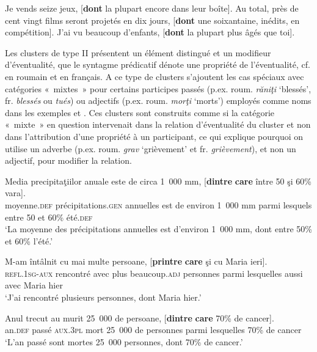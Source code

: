 \ea \label{ch3:ex32}
\ea
Je vends seize jeux, [\textbf{dont} la plupart encore dans leur boîte]. \label{ch3:ex32a}
\ex 
Au total, près de cent vingt films seront projetés en dix jours, [\textbf{dont} une soixantaine, inédits, en compétition]. \label{ch3:ex32b}
\ex 
J’ai vu beaucoup d’enfants, [\textbf{dont} la plupart plus âgés que toi]. \label{ch3:ex32c}
\z 
\z 

Les clusters de type II présentent un élément distingué et un modifieur d’éven\-tualité, {{\cad}} que le syntagme prédicatif dénote une propriété de l’éventualité, cf.  en roumain et  en français. A ce type de clusters s’ajoutent les cas spéciaux avec catégories «~mixtes~» pour certains participes passés (p.ex. roum. \textit{răniţi} ‘blessés’, fr. \textit{blessés} ou \textit{tués}) ou adjectifs (p.ex. roum. \textit{morţi} ‘morts’) employés comme noms dans les exemples  et . Ces clusters sont construits comme si la catégorie «~mixte~» en question intervenait dans la relation d’éventualité du cluster et non dans l’attribution d’une propriété à un participant, ce qui explique pourquoi on utilise un adverbe (p.ex. roum. \textit{grav} ‘grièvement’ et fr. \textit{grièvement}), et non un adjectif, pour modifier la relation.

\ea \label{ch3:ex33}
\ea 
\gll Media  precipitaţiilor  anuale  este  de  circa  1~000  mm,  [\textbf{dintre} \textbf{care}  între  50  şi  60\%  vara]. \label{ch3:ex33a}\\
moyenne.\textsc{def}  précipitations.\textsc{gen}  annuelles  est  de  environ  1~000  mm  parmi lesquels  entre  50  et  60\%  été.\textsc{def} \\
\glt ‘La moyenne des précipitations annuelles est d’environ 1~000 mm, dont entre 50\% et 60\% l’été.’

\ex 
\gll M-am  întâlnit  cu  mai  multe  persoane,  [\textbf{printre} \textbf{care} şi  cu  Maria  ieri]. \label{ch3:ex33b}\\
\textsc{refl.1sg-aux} rencontré  avec  plus  beaucoup.\textsc{adj} personnes  parmi  lesquelles aussi  avec  Maria  hier \\
\glt ‘J’ai rencontré plusieurs personnes, dont Maria hier.’

\ex 
\gll Anul  trecut  au  murit  25~000  de  persoane,  [\textbf{dintre} \textbf{care} 70\%  de  cancer]. \label{ch3:ex33c}\\
an.\textsc{def}  passé  \textsc{aux.3pl}  mort  25~000  de  personnes  parmi  lesquelles  70\% de  cancer \\
\glt ‘L’an passé sont mortes 25~000 personnes, dont 70\% de cancer.’ 


